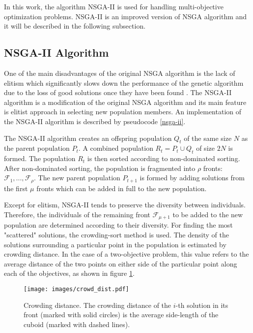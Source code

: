 In this work, the algorithm NSGA-II is used for handling multi-objective optimization problems. 
NSGA-II is an improved version of NSGA algorithm and it will be described in the following subsection. 

\subsection{NSGA-II Algorithm}
One of the main disadvantages of the original NSGA algorithm is the lack of elitism which significantly slows down the performance of the genetic algorithm due to the loss of good solutions once they have been found \cite{deb2000fast}. 
The NSGA-II algorithm is a modification of the original NSGA algorithm and its main feature is elitist approach in selecting new population members. 
An implementation of the NSGA-II algorithm is described by pseudocode \ref{nsga-ii}.

The NSGA-II algorithm creates an offspring population $Q_t$ of the same size $N$ as the parent population $P_t$.
A combined population $R_t = P_t \cup Q_t$ of size $2N$ is formed.
The population $R_t$ is then sorted according to non-dominated sorting. 
After non-dominated sorting, the population is fragmented into $\rho$ fronts: $\mathcal{F}_1, ..., \mathcal{F}_\rho$.
The new parent population $P_{t+1}$ is formed by adding solutions from the first $\mu$ fronts which can be added in full to the new population. 

Except for elitism, NSGA-II tends to preserve the diversity between individuals. 
Therefore, the individuals of the remaining front $\mathcal{F}_{\mu+1}$ to be added to the new population are determined according to their diversity. 
For finding the most "scattered" solutions, the crowding-sort method is used. 
The density of the solutions surrounding a particular point in the population is estimated by crowding distance. 
In the case of a two-objective problem, this value refers to the average distance of the two points on either side of the particular point along each of the objectives, as shown in figure 
\ref{crowding_dist}. 

\begin{figure}[ht]
    \centering
    \texttt{[image: images/crowd\_dist.pdf]}
    \caption{Crowding distance. The crowding distance of the $i$-th solution in its front (marked with solid circles) is the average side-length of the cuboid (marked with dashed lines). }
    \label{crowding_dist}
\end{figure}

